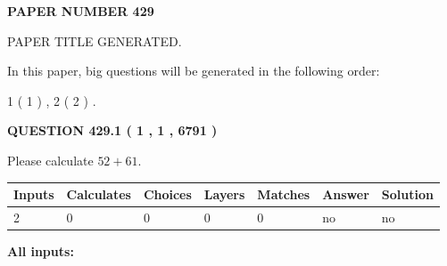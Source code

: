 \documentclass[12pt]{article}
\begin{document}
   
   
   
\newpage 
\setcounter{page}{ 
   429001 } 
   
   
   
   
 {\textbf{ \Large{ PAPER NUMBER  429  }}}
   
   
\vspace{0.2in}
   
   
   
   
   
   
   
   
 \vspace{0.2in}
 
 
 
 
   
   
 PAPER TITLE GENERATED.
   
   
   
\vspace{0.2in}
   
In this paper, big questions will be generated in the following order: 
   
   
   1 ( 1 )
 ,
   2 ( 2 )
 .
  
\vspace{0.2in}
  
{\textbf{\Large{QUESTION
429.1 
 ( 1 , 1 , 6791 )
}}}
  
  
 
Please calculate $ %
52 +  %
61 $.
 
 
   
   
   
   
\noindent\begin{tabular}{|l|l|l|l|l|l|l|}
 \hline
Inputs & Calculates & Choices & Layers & Matches & Answer & Solution \\ \hline
 2  & 
 0  & 
 0
  & 
 0  & 
 0  & 
  no & 
  no 
  \\ \hline
 \end{tabular}
   
   
   
   
\noindent{}
   
   
   
   
\noindent\vspace{0.1in}\hspace{-0.08in} {\textbf{\Large{All inputs: }}}
   
   
  
\end{document}
